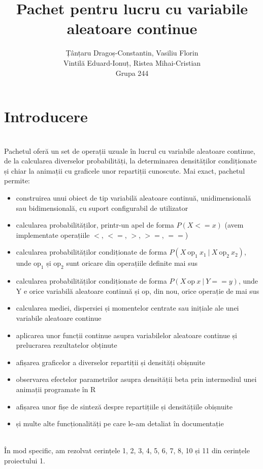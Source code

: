 \documentclass[12pt]{article}
\title{Pachet pentru lucru cu variabile aleatoare continue}
\author{Țânțaru Dragoș-Constantin, Vasiliu Florin \\Vintilă Eduard-Ionuț, Ristea Mihai-Cristian\\Grupa 244}
\begin{document}
\maketitle
\section{Introducere} \hfill \\
\indent Pachetul oferă un set de operații uzuale în lucrul cu variabile aleatoare continue, de la calcularea diverselor probabilități, la determinarea densităților condiționate și chiar la animații cu graficele unor repartiții cunoscute. Mai exact, pachetul permite:
\begin{itemize}
	\item construirea unui obiect de tip variabilă aleatoare continuă, unidimensională sau bidimensională, cu suport configurabil de utilizator
	\item calcularea probabilităților, printr-un apel de forma $P(X <= x)$ (avem implementate operațiile $<$, $<=$, $>$, $>=$, $==$)
	\item calcularea probabilităților condiționate de forma $P(X \ \mathrm{op_1} \ x_1 \ | \ X \ \mathrm{op_2} \ x_2)$, unde $\mathrm{op_1}$ și $\mathrm{op_2}$ sunt oricare din operațiile definite mai sus
	\item calcularea probabilităților condiționate de forma $P(X \ \mathrm{op} \ x \ | \ Y == y)$, unde Y e orice variabilă aleatoare continuă și op, din nou, orice operație de mai sus
	\item calcularea mediei, dispersiei și momentelor centrate sau inițiale ale unei variabile aleatoare continue
	\item aplicarea unor funcții continue asupra variabilelor aleatoare continue și prelucrarea rezultatelor obținute
	\item afișarea graficelor a diverselor repartiții și densități obișnuite
	\item observarea efectelor parametrilor asupra densității beta prin intermediul unei animații programate în R
	\item afișarea unor fișe de sinteză despre repartițiile și densitățiile obișnuite
	\item și multe alte funcționalități pe care le-am detaliat în documentație
\end{itemize} \hfill \\
\indent În mod specific, am rezolvat cerințele 1, 2, 3, 4, 5, 6, 7, 8, 10 și 11 din cerințele proiectului 1. \\
\end{document}
